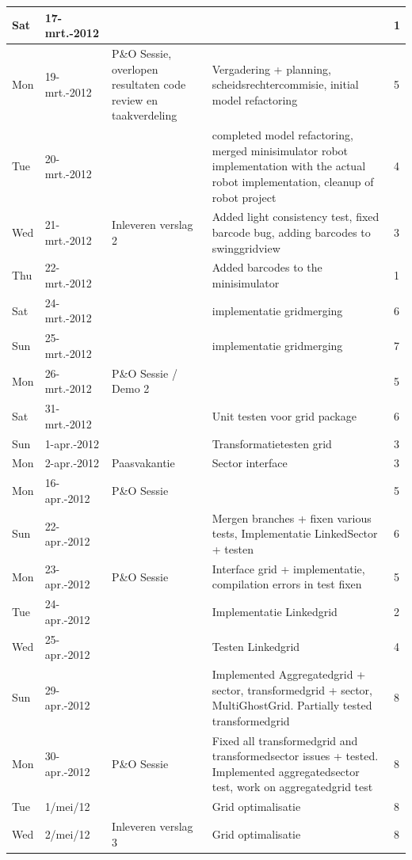 \documentclass[12pt,a4paper]{report}
\begin{document}
\begin{landscape}
\begin{longtable}{llp{7cm}p{10cm}l}
\hline
Sat & 17-mrt.-2012 &  &  & 1 \\ 
\hline
Mon & 19-mrt.-2012 & P\&O Sessie, overlopen resultaten code review en taakverdeling & Vergadering + planning, scheidsrechtercommisie, initial model refactoring & 5 \\ 
\hline
Tue & 20-mrt.-2012 &  & completed model refactoring, merged minisimulator robot implementation with the actual robot implementation, cleanup of robot project & 4 \\ 
\hline
Wed & 21-mrt.-2012 & Inleveren verslag 2 & Added light consistency test, fixed barcode bug, adding barcodes to swinggridview & 3 \\ 
\hline
Thu & 22-mrt.-2012 &  & Added barcodes to the minisimulator & 1 \\ 
\hline
Sat & 24-mrt.-2012 &  & implementatie gridmerging & 6 \\ 
\hline
Sun & 25-mrt.-2012 &  & implementatie gridmerging & 7 \\ 
\hline
Mon & 26-mrt.-2012 & P\&O Sessie / Demo 2 &  & 5 \\ 
\hline
Sat & 31-mrt.-2012 &  & Unit testen voor grid package & 6 \\ 
\hline
Sun & 1-apr.-2012 &  & Transformatietesten grid & 3 \\ 
\hline
Mon & 2-apr.-2012 & Paasvakantie & Sector interface & 3 \\ 
\hline
Mon & 16-apr.-2012 & P\&O Sessie &  & 5 \\ 
\hline
Sun & 22-apr.-2012 &  & Mergen branches + fixen various tests, Implementatie LinkedSector + testen & 6 \\ 
\hline
Mon & 23-apr.-2012 & P\&O Sessie & Interface grid + implementatie, compilation errors in test fixen & 5 \\ 
\hline
Tue & 24-apr.-2012 &  & Implementatie Linkedgrid & 2 \\ 
\hline
Wed & 25-apr.-2012 &  & Testen Linkedgrid & 4 \\ 
\hline
Sun & 29-apr.-2012 &  & Implemented Aggregatedgrid + sector, transformedgrid + sector, MultiGhostGrid. Partially tested transformedgrid & 8 \\ 
\hline
Mon & 30-apr.-2012 & P\&O Sessie & Fixed all transformedgrid and transformedsector issues + tested. Implemented aggregatedsector test, work on aggregatedgrid test & 8 \\ 
\hline
Tue & 1/mei/12 &  & Grid optimalisatie & 8 \\ 
\hline
Wed & 2/mei/12 & Inleveren verslag 3 & Grid optimalisatie & 8 \\ 

\end{longtable}
\end{landscape}
\end{document}
